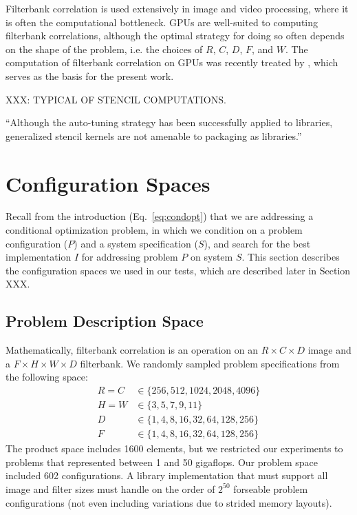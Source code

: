 \documentclass{sig-alternate}
\begin{document}
Filterbank correlation is used extensively in image and video processing,
where it is often the computational bottleneck.
GPUs are well-suited to computing filterbank correlations, although the
optimal strategy for doing so often depends on the shape of the problem, i.e.
the choices of $R$, $C$, $D$, $F$, and $W$.
The computation of filterbank correlation on GPUs was recently treated by
\citet{pinto+cox:2011gcg}, which serves as the basis for the present work.

XXX: TYPICAL OF STENCIL COMPUTATIONS.

``Although the auto-tuning strategy has been successfully applied to libraries,
generalized stencil kernels are not amenable to packaging as libraries.''
\cite{kamil+etal:2009}


\cite{datta:2009}


\section{Configuration Spaces}

Recall from the introduction (Eq.~\ref{eq:condopt}) that we are addressing a
conditional optimization problem, in which we condition on a problem
configuration ($P$) and a system specification ($S$), and search for the best
implementation $I$ for addressing problem $P$ on system $S$.
This section describes the configuration spaces we used in our tests,
which are described later in Section XXX.


\subsection{Problem Description Space}

Mathematically, filterbank correlation is an operation on an $R \times C \times
D$ image and a $F \times H \times W \times D$ filterbank.
We randomly sampled problem specifications from the following space:
\begin{align*}
R = C & \in \{ 256, 512, 1024, 2048, 4096 \} \\
H = W & \in \{ 3, 5, 7, 9, 11 \} \\
D &  \in \{1, 4, 8, 16, 32, 64, 128, 256 \} \\
F &  \in \{1, 4, 8, 16, 32, 64, 128, 256 \}
\end{align*}
The product space
includes 1600 elements, but we restricted our experiments to problems that
represented between 1 and 50 gigaflops. Our problem space included 602
configurations. A library implementation that must support all image and
filter sizes must handle on the order of $2^{50}$ forseable
problem configurations (not even including variations due to strided memory
layouts).
\end{document}
